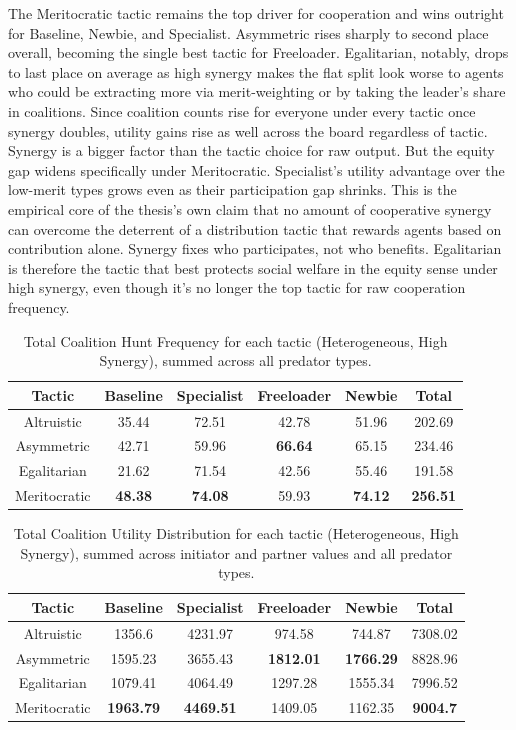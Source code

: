 \documentclass[12pt,a4paper]{report}
\begin{document}
	The Meritocratic tactic remains the top driver for cooperation and wins outright for Baseline, Newbie, and Specialist. Asymmetric rises sharply to second place overall, becoming the single best tactic for Freeloader. Egalitarian, notably, drops to last place on average as high synergy makes the flat split look worse to agents who could be extracting more via merit-weighting or by taking the leader's share in coalitions. Since coalition counts rise for everyone under every tactic once synergy doubles, utility gains rise as well across the board regardless of tactic. Synergy is a bigger factor than the tactic choice for raw output. But the equity gap widens specifically under Meritocratic. Specialist's utility advantage over the low-merit types grows even as their participation gap shrinks. This is the empirical core of the thesis's own claim that no amount of cooperative synergy can overcome the deterrent of a distribution tactic that rewards agents based on contribution alone. Synergy fixes who participates, not who benefits. Egalitarian is therefore the tactic that best protects social welfare in the equity sense under high synergy, even though it's no longer the top tactic for raw cooperation frequency.
	
	\begin{table}[H]
		\centering
		\begin{tabular}{|c|c|c|c|c|c|}
			\hline
			Tactic & Baseline & Specialist & Freeloader & Newbie & Total \\
			\hline
			Altruistic & 35.44 & 72.51 & 42.78 & 51.96 & 202.69 \\
			Asymmetric & 42.71 & 59.96 & \textbf{66.64} & 65.15 & 234.46 \\
			Egalitarian & 21.62 & 71.54 & 42.56 & 55.46 & 191.58 \\
			Meritocratic & \textbf{48.38} & \textbf{74.08} & 59.93 & \textbf{74.12} & \textbf{256.51} \\
			\hline
		\end{tabular}
		\caption{Total Coalition Hunt Frequency for each tactic (Heterogeneous, High Synergy), summed across all predator types.}
	\end{table}
	
	\begin{table}[H]
		\centering
		\begin{tabular}{|c|c|c|c|c|c|}
			\hline
			Tactic & Baseline & Specialist & Freeloader & Newbie & Total \\
			\hline
			Altruistic & 1356.6 & 4231.97 & 974.58 & 744.87 & 7308.02 \\
			Asymmetric & 1595.23 & 3655.43 & \textbf{1812.01} & \textbf{1766.29} & 8828.96 \\
			Egalitarian & 1079.41 & 4064.49 & 1297.28 & 1555.34 & 7996.52 \\
			Meritocratic & \textbf{1963.79} & \textbf{4469.51} & 1409.05 & 1162.35 & \textbf{9004.7}\\
			\hline
		\end{tabular}
		\caption{Total Coalition Utility Distribution for each tactic (Heterogeneous, High Synergy), summed across initiator and partner values and all predator types.}
	\end{table}
	
\end{document}
